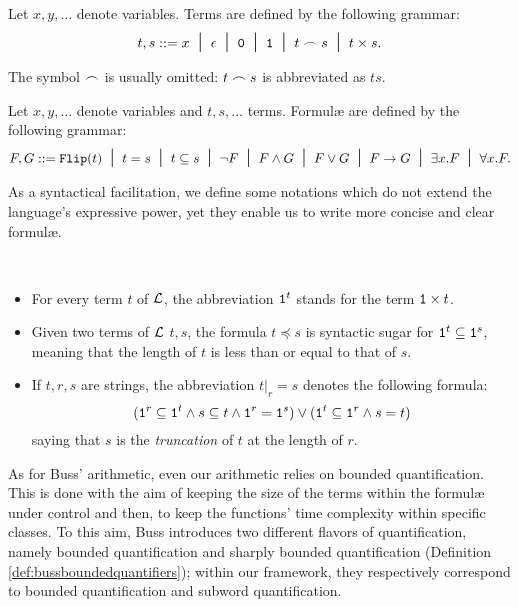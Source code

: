 \begin{defn}[Terms]
  \label{def:lpwterms}
Let $x,y,\dots$ denote variables.
Terms are defined by the following grammar:
$$
t,s ::= x \; \; \mbox{\Large{$\mid$}}\;\; \epsilon \; \; \mbox{\Large{$\mid$}}\;\; \mathtt{0} \; \; \mbox{\Large{$\mid$}}\;\; \mathtt{1}
\; \; \mbox{\Large{$\mid$}}\;\; t \frown s \; \; \mbox{\Large{$\mid$}}\;\; t\times s.
$$
\end{defn}


\begin{notation}
The symbol $\frown$ is usually omitted:
$t\frown s$ is abbreviated as $ts$.
\end{notation}


\begin{defn}[Formul\ae{}]
Let $x,y,\dots$ denote variables and
$t,s,\dots$ terms.
Formul\ae{} are defined by the following
grammar:
$$
F, G ::= \mathtt{Flip}(t) \; \; \mbox{\Large{$\mid$}}\;\; t=s \; \; \mbox{\Large{$\mid$}}\;\; t\subseteq s
\; \; \mbox{\Large{$\mid$}}\;\; \neg F \; \; \mbox{\Large{$\mid$}}\;\; F\wedge G \; \; \mbox{\Large{$\mid$}}\;\; F\vee G
\; \; \mbox{\Large{$\mid$}}\;\; F\rightarrow G \; \; \mbox{\Large{$\mid$}}\;\; \exists x.F \; \; \mbox{\Large{$\mid$}}\;\;
\forall x.F.
$$
\end{defn}

As a syntactical facilitation, we define some notations which do not extend the
language's expressive power, yet they enable us to write more concise and clear formul\ae{}.

\begin{notation}[Exponentiation]~
  \begin{itemize}
    \item For every term $t$ of $\mathcal{L}$, the abbreviation
    $\mathtt{1}^t$ stands for the term $\mathtt{1}\times t$.
    \item Given two terms of $\mathcal{L}$ $t,s$,
    the formula $t\preceq s$ is syntactic
    sugar for $\mathtt{1}^t\subseteq \mathtt{1}^s$,
    meaning that
    the length of $t$ is
    less than or equal to that of $s$.
    \item If
      $t,r,s$ are strings, the
      abbreviation $t|_r=s$
      denotes the following formula:
      $$
      (\mathtt{1}^r\subseteq \mathtt{1}^t
      \wedge s\subseteq t \wedge \mathtt{1}^r=\mathtt{1}^s)
      \vee (\mathtt{1}^t\subseteq \mathtt{1}^r \wedge s=t)
      $$
      saying that $s$ is the \emph{truncation}
      of $t$ at the length of $r$.
  \end{itemize}
\end{notation}

As for Buss' arithmetic, even our arithmetic relies on bounded quantification.
This is done with the aim of keeping the size of the terms within the formul\ae{}
under control and then, to keep the functions' time complexity within specific classes.
%
To this aim, Buss introduces two different flavors of quantification, namely
bounded quantification and
sharply bounded quantification (Definition \ref{def:bussboundedquantifiers});
within our framework, they respectively correspond to
 bounded quantification and subword quantification.

